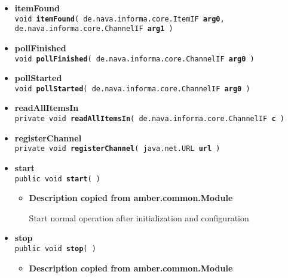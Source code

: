 {{{\begin{itemize}
{\begin{itemize}
{Creates a Story object with the contents of the item and posts it to Psyclone
}
\item{
{\bf Parameters}
  \begin{itemize}
   \item{
{\tt item} -- }
  \end{itemize}
}%
\end{itemize}
}%
 \item{ 
{\bf itemFound}\\
{\tt  void\ {\bf itemFound}( {\tt de.nava.informa.core.ItemIF} {\bf arg0},
{\tt de.nava.informa.core.ChannelIF} {\bf arg1} )
\label{amber.crawler.RSS.itemFound(de.nava.informa.core.ItemIF, de.nava.informa.core.ChannelIF)}}%
}%
 \item{ 
{\bf pollFinished}\\
{\tt  void\ {\bf pollFinished}( {\tt de.nava.informa.core.ChannelIF} {\bf arg0} )
\label{amber.crawler.RSS.pollFinished(de.nava.informa.core.ChannelIF)}}%
}%
 \item{ 
{\bf pollStarted}\\
{\tt  void\ {\bf pollStarted}( {\tt de.nava.informa.core.ChannelIF} {\bf arg0} )
\label{amber.crawler.RSS.pollStarted(de.nava.informa.core.ChannelIF)}}%
}%
 \item{ 
{\bf readAllItemsIn}\\
{\tt private void\ {\bf readAllItemsIn}( {\tt de.nava.informa.core.ChannelIF} {\bf c} )
\label{amber.crawler.RSS.readAllItemsIn(de.nava.informa.core.ChannelIF)}}%
}%
 \item{ 
{\bf registerChannel}\\
{\tt private void\ {\bf registerChannel}( {\tt java.net.URL} {\bf url} )
\label{amber.crawler.RSS.registerChannel(java.net.URL)}}%
}%
 \item{ 
{\bf start}\\
{\tt public void\ {\bf start}(  )
\label{amber.crawler.RSS.start()}}%
\begin{itemize}
\item{
{\bf Description copied from amber.common.Module{\small {}} }

Start normal operation after initialization and configuration
}
\end{itemize}
}%
 \item{ 
{\bf stop}\\
{\tt public void\ {\bf stop}(  )
\label{amber.crawler.RSS.stop()}}%
\begin{itemize}
\item{
{\bf Description copied from amber.common.Module{\small {}} }

}
\end{itemize}}
\end{itemize}}}}
